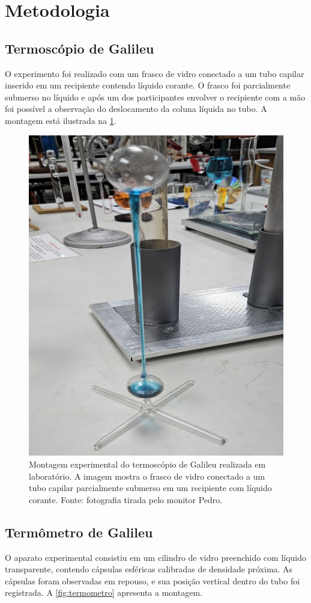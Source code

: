 \section{Metodologia}

\subsection{Termoscópio de Galileu}
O experimento foi realizado com um frasco de vidro conectado a um tubo capilar inserido em um recipiente contendo líquido corante. O frasco foi parcialmente submerso no líquido e após um dos participantes envolver o recipiente com a mão foi possível a observação do deslocamento da coluna líquida no tubo. A montagem está ilustrada na \cref{fig:termoscopio}.

\begin{figure}[H]
    \centering
    \includegraphics[width=0.35\linewidth]{fig/termoscopio.png}
    \caption{Montagem experimental do termoscópio de Galileu realizada em laboratório. A imagem mostra o frasco de vidro conectado a um tubo capilar parcialmente submerso em um recipiente com líquido corante. Fonte: fotografia tirada pelo monitor Pedro.}
    \label{fig:termoscopio}
\end{figure}

\subsection{Termômetro de Galileu}
O aparato experimental consistiu em um cilindro de vidro preenchido com líquido transparente, contendo cápsulas esféricas calibradas de densidade próxima. As cápsulas foram observadas em repouso, e sua posição vertical dentro do tubo foi registrada. A \cref{fig:termometro} apresenta a montagem.

